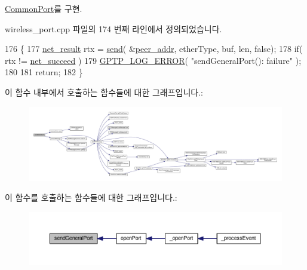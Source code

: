 \hyperlink{class_common_port_a03f7724f30d3559245970e517b977a82}{Common\+Port}를 구현.



wireless\+\_\+port.\+cpp 파일의 174 번째 라인에서 정의되었습니다.


\begin{DoxyCode}
176 \{
177     \hyperlink{avbts__osnet_8hpp_a21b2b4b5e479ef3adfc039ac30c961cd}{net\_result} rtx = \hyperlink{class_common_port_a16eac0643a26a66fa2b664d4db5d3e42}{send}( &\hyperlink{class_wireless_port_a2e3c335f16cf24c8ca44069a6c6149e0}{peer\_addr}, etherType, buf, len, \textcolor{keyword}{false});
178     \textcolor{keywordflow}{if}( rtx != \hyperlink{avbts__osnet_8hpp_a21b2b4b5e479ef3adfc039ac30c961cda349eff10b7ad8aef2477575f9306e579}{net\_succeed} )
179         \hyperlink{gptp__log_8hpp_afefbb1009717c128012bfeed94842987}{GPTP\_LOG\_ERROR}( \textcolor{stringliteral}{"sendGeneralPort(): failure"} );
180 
181     \textcolor{keywordflow}{return};
182 \}
\end{DoxyCode}


이 함수 내부에서 호출하는 함수들에 대한 그래프입니다.\+:
\nopagebreak
\begin{figure}[H]
\begin{center}
\leavevmode
\includegraphics[width=350pt]{class_wireless_port_a9de15e5c639faaf04407f126e241358a_cgraph}
\end{center}
\end{figure}




이 함수를 호출하는 함수들에 대한 그래프입니다.\+:
\nopagebreak
\begin{figure}[H]
\begin{center}
\leavevmode
\includegraphics[width=350pt]{class_wireless_port_a9de15e5c639faaf04407f126e241358a_icgraph}
\end{center}
\end{figure}


